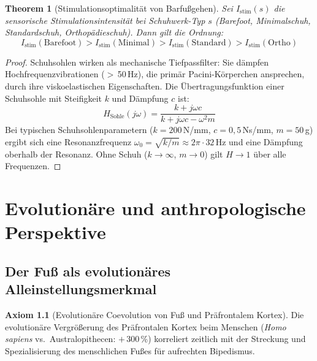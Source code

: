 ﻿\documentclass[12pt,a4paper]{report}
\theoremstyle{plain}
\newtheorem{theorem}{Theorem}[section]
\theoremstyle{definition}
\newtheorem{axiom}[theorem]{Axiom}
\theoremstyle{remark}
\begin{document}
\begin{theorem}[Stimulationsoptimalität von Barfußgehen]
Sei $I_{\text{stim}}(s)$ die sensorische Stimulationsintensität bei
Schuhwerk-Typ $s$ (Barefoot, Minimalschuh, Standardschuh, Orthopädieschuh).
Dann gilt die Ordnung:
\[
  I_{\text{stim}}(\text{Barefoot}) > I_{\text{stim}}(\text{Minimal}) >
  I_{\text{stim}}(\text{Standard}) > I_{\text{stim}}(\text{Ortho})
\]
\end{theorem}

\begin{proof}
Schuhsohlen wirken als mechanische Tiefpassfilter: Sie dämpfen
Hochfrequenzvibrationen ($>$\,50\,Hz), die primär Pacini-Körperchen ansprechen,
durch ihre viskoelastischen Eigenschaften. Die Übertragungsfunktion einer
Schuhsohle mit Steifigkeit $k$ und Dämpfung $c$ ist:
\[
  H_{\text{Sohle}}(j\omega) = \frac{k + j\omega c}{k + j\omega c - \omega^2 m}
\]
Bei typischen Schuhsohlenparametern ($k = 200$\,N/mm, $c = 0{,}5$\,Ns/mm,
$m = 50$\,g) ergibt sich eine Resonanzfrequenz $\omega_0 = \sqrt{k/m}
\approx 2\pi \cdot 32$\,Hz und eine Dämpfung oberhalb der Resonanz.
Ohne Schuh ($k \to \infty$, $m \to 0$) gilt $H \to 1$ über alle Frequenzen.
\end{proof}

\chapter{Evolutionäre und anthropologische Perspektive}

\section{Der Fuß als evolutionäres Alleinstellungsmerkmal}

\begin{axiom}[Evolutionäre Coevolution von Fuß und Präfrontalem Kortex]
Die evolutionäre Vergrößerung des Präfrontalen Kortex beim Menschen
(\emph{Homo sapiens} vs.\ Australopithecen: $+$\,300\,\%) korreliert
zeitlich mit der Streckung und Spezialisierung des menschlichen Fußes
für aufrechten Bipedismus.
\end{axiom}
\end{document}
